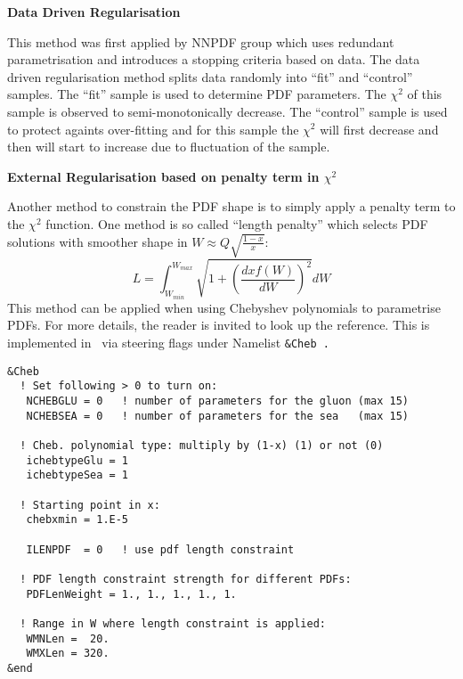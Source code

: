 
\begin{description}

\item \bf{Data Driven Regularisation}\rm

This method was first applied by NNPDF group which uses redundant parametrisation and introduces a stopping criteria based on data.
The data driven regularisation method splits data randomly into ``fit'' and ``control''  samples. The ``fit'' sample is used to determine PDF parameters. The $\chi^2$ of this sample is observed to semi-monotonically decrease. The ``control'' sample is used to protect againts over-fitting and for this sample the $\chi^2$ will first decrease and then will start to increase due to fluctuation of the sample.


\item \bf{External Regularisation based on penalty term in $\chi^2$} \rm

Another method to constrain the PDF shape is to simply apply a penalty term
to the $\chi^2$ function. 
One method is so called ``length penalty'' which selects PDF solutions with smoother shape in $W\approx Q\sqrt{\frac{1-x}{x}}$:
\begin{equation}
L=\int_{W_{min}}^{W_{max}} \sqrt{1+\left(\frac{dxf(W)}{dW}\right)^2}dW
\end{equation}
This method can be applied when using Chebyshev polynomials to parametrise PDFs.
For more details, the reader is invited to look up the \cite{Chebyshev} reference.
This is implemented in \fitter\ via steering flags under Namelist \tt \&Cheb \rm.
\begin{verbatim}
&Cheb
  ! Set following > 0 to turn on:
   NCHEBGLU = 0   ! number of parameters for the gluon (max 15)
   NCHEBSEA = 0   ! number of parameters for the sea   (max 15)

  ! Cheb. polynomial type: multiply by (1-x) (1) or not (0)  
   ichebtypeGlu = 1 
   ichebtypeSea = 1 

  ! Starting point in x:
   chebxmin = 1.E-5

   ILENPDF  = 0   ! use pdf length constraint

  ! PDF length constraint strength for different PDFs:
   PDFLenWeight = 1., 1., 1., 1., 1.     

  ! Range in W where length constraint is applied:
   WMNLen =  20.
   WMXLen = 320.
&end
\end{verbatim}


\end{description}
